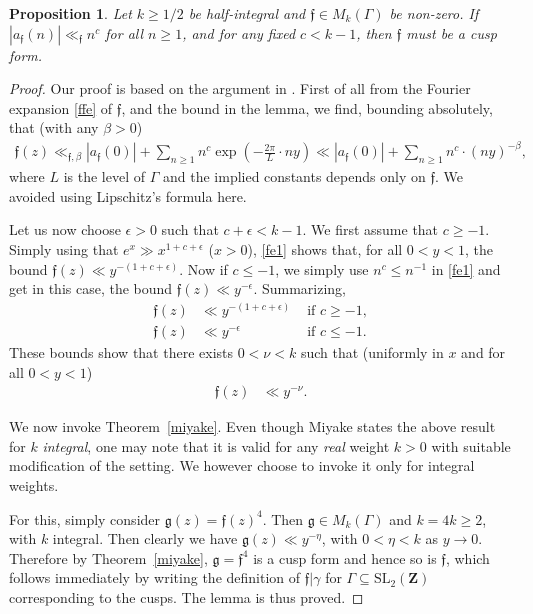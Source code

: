 \documentclass[12pt]{amsart}
\numberwithin{equation}{section}
\theoremstyle{plain}
\newtheorem{prop}[thm]{Proposition}
\newcommand{\thmref}[1]{Theorem~\ref{#1}}
\theoremstyle{definition}
\newcommand{\mf}{\mathbf}
\newcommand{\mk}{\mathfrak}
\newcommand{\mrm}{\mathrm}
\newcommand{\sltwo}{\mrm{SL}_2(\mf Z)}
\newcommand{\sumn}{\sum \nolimits}
\begin{document}
\begin{prop} \label{half-hecke}
Let $ k \geq 1/2$ be half-integral and $\mk f \in M_k(\Gamma)$ be non-zero. If $|a_{\mk f}(n)| \ll_{\mk f} n^{c}$ for all $n \ge 1$, and for any fixed $ c < k-1$, then $\mk f$ must be a cusp form.
\end{prop}

\begin{proof}
Our proof is based on the argument in \cite{miyake}. First of all  from the Fourier expansion \eqref{ffe} of $\mk f$, and the bound in the lemma, we find, bounding absolutely, that (with any $\beta >0$)
\begin{align} \label{fe1}
    \mk f(z) \ll_{\mk f,  \beta} |a_{\mk f}(0)| + \sumn_{n \ge 1} n^c \exp(- \frac{2 \pi}{L} \cdot ny)
    \ll |a_{\mk f}(0)| + \sumn_{n \ge 1} n^c \cdot (ny)^{-\beta},
\end{align}
where $L$ is the level of $\Gamma$ and the implied constants depends only on $\mk f$. We avoided using Lipschitz's formula here.

Let us now choose $\epsilon>0$ such that $c+\epsilon<k-1$.
We first assume that $c \ge -1$. Simply using that $e^x \gg x^{1+c+\epsilon}$ ($x>0$), \eqref{fe1} shows that, for all $0<y<1$, the bound $\displaystyle \mk f(z) \ll y^{-(1+c+\epsilon)}$.
Now if $c \le -1$, we simply use $n^c \le n^{-1}$ in \eqref{fe1} and get in this case, the bound $\displaystyle \mk f(z) \ll y^{-\epsilon}$. Summarizing,
\begin{align} \label{fe2}
    \mk f(z) &\ll y^{-(1+c+\epsilon)} & \text{ if } c \ge -1, \\
    \mk f(z) &\ll y^{-\epsilon} & \text{ if } c \le -1.
\end{align}
These bounds show that there exists $0<\nu<k$ such that (uniformly in $x$ and for all $0<y<1$)
\begin{align} \label{fe3}
    \mk f(z) &\ll y^{-\nu}.
\end{align}

We now invoke \thmref{miyake}.
Even though Miyake states the above result for $k$ \textit{integral}, one may  note that it is valid for any \textit{real} weight $k >0$ with suitable modification of the setting.
We however choose to invoke it only for integral weights.

For this, simply consider $\mk g(z)=\mk f(z)^4$. Then $\mk g \in M_{k}(\Gamma)$ and $k=4k \ge 2$, with $k$ integral. Then clearly we have $\mk g(z) \ll y^{- \eta}$, with $0<\eta<k$ as $y \to 0$. Therefore by Theorem~\ref{miyake}, $\mk  g= \mk f^4$ is a cusp form and hence so is $\mk f$, which follows immediately by writing the definition of $\mk f|\gamma$ for $\Gamma \subseteq \sltwo$ corresponding to the cusps. The lemma is thus proved.
\end{proof}
\end{document}
